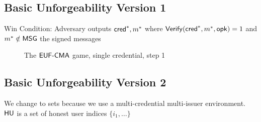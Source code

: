 \subsection{Basic Unforgeability Version 1}
Win Condition: Adversary outputs $\mathsf{cred}^*, m^*$ where $\mathsf{Verify}(\mathsf{cred}^*, m^*, \mathsf{opk}) = 1$ and $m^* \notin \mathsf{MSG}$ the signed messages
\begin{figure}
\begin{pchstack}[boxed, center, space=1em]
    \begin{pcvstack}
    \end{pcvstack}
\end{pchstack}
  \caption{The $\mathsf{EUF\text{-}CMA}$ game, single credential, step 1}
  \label{fig:prf}
\end{figure}



\subsection{Basic Unforgeability Version 2}
We change to sets because we use a multi-credential multi-issuer environment. $\mathsf{HU}$ is a set of honest user indices $\{i_1, \ldots\}$

